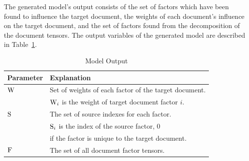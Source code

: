 \documentclass[../ut-dissertation.tex]{subfiles}
\begin{document}
The generated model's output consists of the set of factors which have
been found to influence the target document, the weights of each
document's influence on the target document, and the set of factors
found from the decomposition of the document tensors.  The output variables of
the generated model are described in Table~\ref{table:modelOutput}.
\begin{table}[p]
  \centering
  \caption{Model Output}
  \label{table:modelOutput}

  \begin{tabular}{ll}
    \hline
    Parameter & Explanation\\
    \hline
    $\mathrm{W}$ & Set of weights of each factor of the target document.\\
              & $\mathrm{W}_i$ is the weight of target document factor $i$.\\
    $\mathrm{S}$ & The set of source indexes for each factor.\\
              & $\mathrm{S}_i$ is the index of the source factor, 0 \\
              & if the factor is unique to the target document.\\
    $\mathrm{F}$ & The set of all document factor tensors.\\
    \hline
  \end{tabular}
\end{table}
\end{document}
